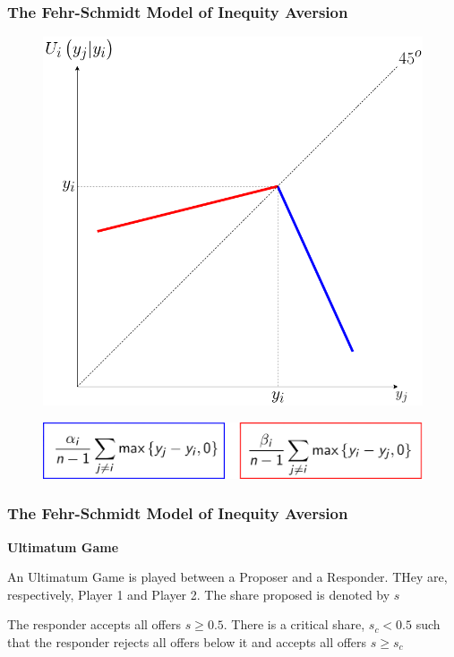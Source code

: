 \documentclass{beamer}
\begin{document}
\begin{frame}
	\frametitle{The Fehr-Schmidt Model of Inequity Aversion}
	\begin{center}
		\begin{figure}

			\includegraphics[scale=0.245]{fehrschmidt.png}

		\end{figure}
	\end{center}
	\begin{center}
	\begin{figure}
		\includegraphics[scale=0.15]{eq.png}
	\end{figure}
\end{center}

	
\end{frame}
	
\begin{frame}
	\frametitle{The Fehr-Schmidt Model of Inequity Aversion}

	\textbf{Ultimatum Game}
	
	An Ultimatum Game is played between a Proposer and a Responder. THey are, respectively, Player 1 and Player 2. The share proposed is denoted by $s$
	
	\begin{lemma}
		The responder accepts all offers $s \geq 0.5$. There is a critical share, $s_c < 0.5$ such that the responder rejects all offers below it and accepts all offers $s \geq s_c$
	\end{lemma}
	
\end{frame}
\end{document}
